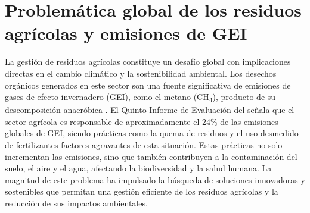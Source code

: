 \section{Problemática global de los residuos agrícolas y emisiones de GEI}

La gestión de residuos agrícolas constituye un desafío global con implicaciones directas en el cambio climático y la sostenibilidad ambiental. Los desechos orgánicos generados en este sector son una fuente significativa de emisiones de gases de efecto invernadero (GEI), como el metano (CH\textsubscript{4}),  producto de su descomposición anaeróbica \parencite{FAO2021}. El Quinto Informe de Evaluación del \textcite{IPCC2014} señala que el sector agrícola es responsable de aproximadamente el 24\% de las emisiones globales de GEI, siendo prácticas como la quema de residuos y el uso desmedido de fertilizantes factores agravantes de esta situación. Estas prácticas no solo incrementan las emisiones, sino que también contribuyen a la contaminación del suelo, el aire y el agua, afectando la biodiversidad y la salud humana. La magnitud de este problema ha impulsado la búsqueda de soluciones innovadoras y sostenibles que permitan una gestión eficiente de los residuos agrícolas y la reducción de sus impactos ambientales.

